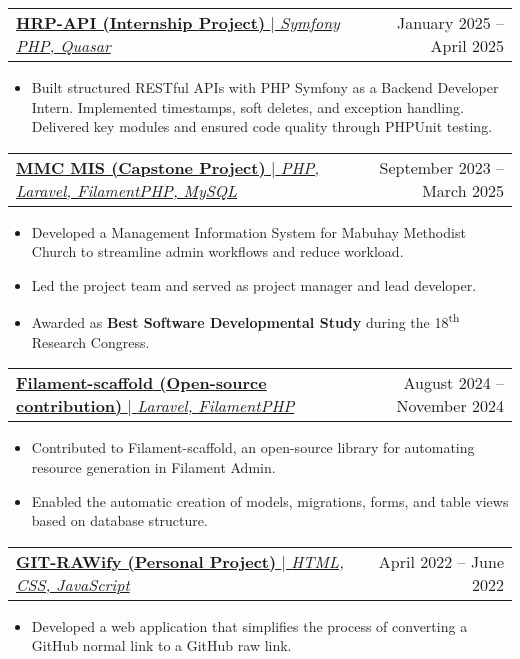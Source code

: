 \documentclass[legal,10pt]{article}
\makeatletter
\newcommand{\resumeItem}[1]{
  \item\small{
    {#1 \vspace{-2pt}}
  }
}
\newcommand{\resumeProjectHeading}[2]{
    \item
    \begin{tabular*}{0.97\textwidth}{l@{\extracolsep{\fill}}r}
      \small#1 & #2 \\
    \end{tabular*}\vspace{-7pt}
}
\newcommand{\resumeItemListStart}{\begin{itemize}}
\newcommand{\resumeItemListEnd}{\end{itemize}\vspace{-5pt}}
\makeatother
\begin{document}
    \resumeProjectHeading
      {\href{https://hrp-api.bapplware.com/api}
      {\textbf{HRP-API (Internship Project)} $|$ \emph{Symfony PHP, Quasar}}}{January 2025 -- April 2025}
      \resumeItemListStart
        \resumeItem{Built structured RESTful APIs with PHP Symfony as a Backend Developer Intern. Implemented timestamps, soft deletes, and exception handling. Delivered key modules and ensured code quality through PHPUnit testing.}
      \resumeItemListEnd

    \resumeProjectHeading
      {\href{https://mmchurch.online}
      {\textbf{MMC MIS (Capstone Project)} $|$ \emph{PHP, Laravel, FilamentPHP, MySQL}}}{September 2023 -- March 2025}
      \resumeItemListStart
        \resumeItem{Developed a Management Information System for Mabuhay Methodist Church to streamline admin workflows and reduce workload.}
        \resumeItem{Led the project team and served as project manager and lead developer.}
        \resumeItem{Awarded as \textbf{Best Software Developmental Study} during the 18\textsuperscript{th} Research Congress.}
      \resumeItemListEnd

    \resumeProjectHeading
      {\href{https://github.com/solutionforest/filament-scaffold}
      {\textbf{Filament-scaffold (Open-source contribution)} $|$ \emph{Laravel, FilamentPHP}}}{August 2024 -- November 2024}
      \resumeItemListStart
        \resumeItem{Contributed to Filament-scaffold, an open-source library for automating resource generation in Filament Admin.}
        \resumeItem{Enabled the automatic creation of models, migrations, forms, and table views based on database structure.}
      \resumeItemListEnd

      \resumeProjectHeading
          {\href{https://git-rawify.vercel.app/}
          {\textbf{GIT-RAWify (Personal Project)} $|$ \emph{HTML, CSS, JavaScript}}}{April 2022 -- June 2022}
            \resumeItemListStart
                \resumeItem{Developed a web application that simplifies the process of converting a GitHub normal link to a GitHub raw link.}
            \resumeItemListEnd
\end{document}
